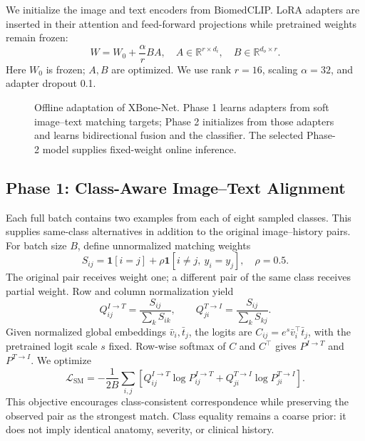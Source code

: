 \documentclass[conference,a4paper]{IEEEtran}
\newcommand{\ind}{\mathbf{1}}
\begin{document}
We initialize the image and text encoders from BiomedCLIP. LoRA adapters are inserted in their attention and feed-forward projections while pretrained weights remain frozen:
\begin{equation}
W=W_0+\frac{\alpha}{r}BA,\quad
A\in\mathbb R^{r\times d_i},\quad B\in\mathbb R^{d_o\times r}.
\label{eq:lora}
\end{equation}
Here $W_0$ is frozen; $A,B$ are optimized. We use rank $r=16$, scaling $\alpha=32$, and adapter dropout 0.1.

\begin{figure}[t]
\centering

\caption{Offline adaptation of XBone-Net. Phase 1 learns adapters from soft image--text matching targets; Phase 2 initializes from those adapters and learns bidirectional fusion and the classifier. The selected Phase-2 model supplies fixed-weight online inference.}
\label{fig:framework}
\end{figure}

\subsection{Phase 1: Class-Aware Image--Text Alignment}
Each full batch contains two examples from each of eight sampled classes. This supplies same-class alternatives in addition to the original image--history pairs. For batch size $B$, define unnormalized matching weights
\begin{equation}
S_{ij}=\ind[i=j]+\rho\ind[i\ne j,\ y_i=y_j],\quad \rho=0.5.
\end{equation}
The original pair receives weight one; a different pair of the same class receives partial weight. Row and column normalization yield
\begin{equation}
Q^{I\to T}_{ij}=\frac{S_{ij}}{\sum_k S_{ik}},\qquad
Q^{T\to I}_{ji}=\frac{S_{ij}}{\sum_k S_{kj}}.
\end{equation}
Given normalized global embeddings $\bar v_i,\bar t_j$, the logits are $C_{ij}=e^s\bar v_i^\top\bar t_j$, with the pretrained logit scale $s$ fixed. Row-wise softmax of $C$ and $C^\top$ gives $P^{I\to T}$ and $P^{T\to I}$. We optimize
\begin{equation}
\mathcal L_{\mathrm{SM}}=-\frac{1}{2B}\sum_{i,j}
\left[Q^{I\to T}_{ij}\log P^{I\to T}_{ij}
+Q^{T\to I}_{ji}\log P^{T\to I}_{ji}\right].
\label{eq:align}
\end{equation}
This objective encourages class-consistent correspondence while preserving the observed pair as the strongest match. Class equality remains a coarse prior: it does not imply identical anatomy, severity, or clinical history.
\end{document}
